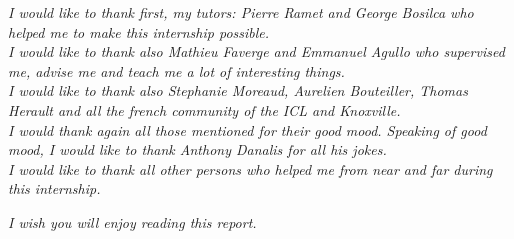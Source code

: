 \textit{I would like to thank first, my tutors: Pierre Ramet and George Bosilca who helped me to make this internship possible.\\
I would like to thank also Mathieu Faverge and Emmanuel Agullo who supervised me, advise me and teach me a lot of interesting things.\\
I would like to thank also Stephanie Moreaud, Aurelien Bouteiller, Thomas Herault and all the french community of the ICL and Knoxville.\\
I would thank again all those mentioned for their good mood. Speaking of good mood, I would like to thank Anthony Danalis for all his jokes.\\
I would like to thank all other persons who helped me from near and far during this internship.}


\begin{flushleft}
\textit{I wish you will enjoy reading this report.}
\end{flushleft}